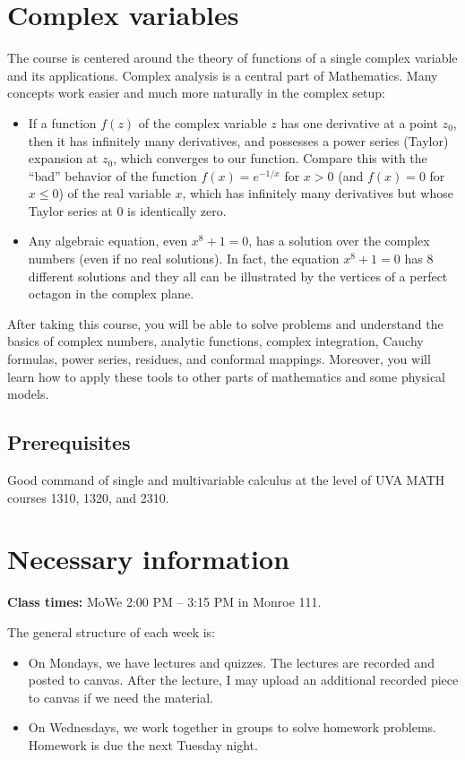 \documentclass[oneside,11pt]{amsart}
\begin{document}
\section{Complex variables}

The course is centered around the theory of functions of a single complex variable and its applications. Complex analysis is a central part of Mathematics. Many concepts work easier and much more naturally in the complex setup:
\begin{itemize}
	\item 
If a function $f(z)$ 
of the complex variable $z$
has one 
derivative at a point $z_0$, then it has infinitely many derivatives,
and possesses a power series (Taylor) expansion at $z_0$, which converges to our function. 
Compare this with the “bad” behavior of the function 
$f(x)=e^{-1/x}$ for $x>0$ (and $f(x)=0$ for $x\le 0$) of the real variable $x$,
which has infinitely many derivatives but whose Taylor series at $0$ is 
identically zero.
\item Any algebraic equation, even $x^{8}+1=0$,
	has a solution over the complex numbers (even
	if no real solutions). In fact, 
	the equation $x^{8}+1=0$ has $8$ different solutions and they all can be 
	illustrated by the vertices of a perfect octagon
	in the complex plane.
\end{itemize}

After taking this course, you 
will be able to solve problems and understand the 
basics of
complex numbers, analytic functions, 
complex integration, Cauchy formulas, power series, 
residues, and conformal mappings.
Moreover, you will learn how to apply these tools to other parts of mathematics and some physical models.

\subsection*{Prerequisites}

Good command of single and multivariable calculus at the level of UVA MATH courses 1310, 1320, and 2310.

\section{Necessary information}
\bigskip

\textbf{Class times:} MoWe 2:00 PM -- 3:15 PM in Monroe 111.

The general structure of each week is:
\begin{itemize}
	\item On Mondays, we have lectures and quizzes. 
	The lectures are recorded and posted to canvas. After the lecture, I may upload an 
	additional recorded piece to canvas if we need the material.
	\item On Wednesdays, we work together in groups to solve homework problems. Homework is due the next Tuesday night.
\end{itemize}
\end{document}
